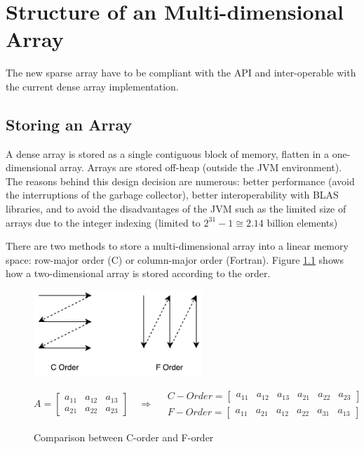 \chapter{Structure of an Multi-dimensional Array}
The new sparse array have to be compliant with the API and inter-operable with the current dense array implementation.



\section{Storing an Array}
\label{sec:storing}

A dense array is stored as a single contiguous block of memory, flatten in a one-dimensional array. Arrays are stored off-heap (outside the JVM environment). The reasons behind this design decision are numerous: better performance (avoid the interruptions of the garbage collector), better interoperability with BLAS libraries, and to avoid the disadvantages of the {JVM} such as the limited size of arrays due to the integer indexing (limited to $2^{31}-1 \cong 2.14 \text{ billion}$ elements)

There are two methods to store a multi-dimensional array into a linear memory space: row-major order (C) or column-major order (Fortran). Figure \ref{fig:orders} shows how a two-dimensional array is stored according to the order.

\begin{figure}[h]
	\begin{center}
		\includegraphics[width=2.5in]{images/c_f_Orders.pdf} 
		\label{fig:cOrders}
	\end{center}
	\[
	A = 
	\begin{bmatrix}
	a_{11} &  a_{12} & a_{13} \\
	a_{21} &  a_{22} & a_{23}
	\end{bmatrix}
	\quad\Rightarrow\quad
	\begin{aligned}
	C-Order = 
	\begin{bmatrix}
	a_{11} &  a_{12} & a_{13} & a_{21} &  a_{22} & a_{23}
	\end{bmatrix}
	\\
	F-Order = 
	\begin{bmatrix}
	a_{11} &  a_{21} & a_{12} & a_{22} &  a_{31} & a_{13}
	\end{bmatrix}
	\end{aligned}
	\]
\caption{Comparison between C-order and F-order}
\label{fig:orders}

\end{figure}


